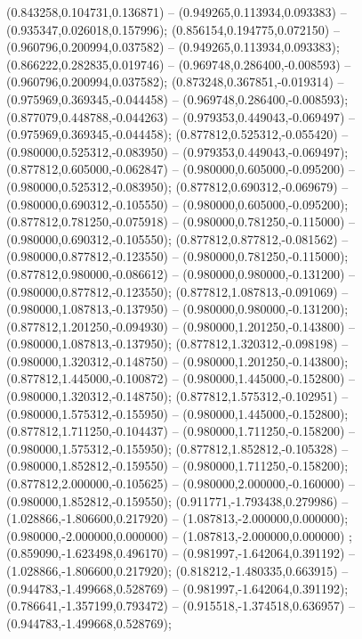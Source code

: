  (0.843258,0.104731,0.136871) -- (0.949265,0.113934,0.093383) -- (0.935347,0.026018,0.157996);
 (0.856154,0.194775,0.072150) -- (0.960796,0.200994,0.037582) -- (0.949265,0.113934,0.093383);
 (0.866222,0.282835,0.019746) -- (0.969748,0.286400,-0.008593) -- (0.960796,0.200994,0.037582);
 (0.873248,0.367851,-0.019314) -- (0.975969,0.369345,-0.044458) -- (0.969748,0.286400,-0.008593);
 (0.877079,0.448788,-0.044263) -- (0.979353,0.449043,-0.069497) -- (0.975969,0.369345,-0.044458);
 (0.877812,0.525312,-0.055420) -- (0.980000,0.525312,-0.083950) -- (0.979353,0.449043,-0.069497);
 (0.877812,0.605000,-0.062847) -- (0.980000,0.605000,-0.095200) -- (0.980000,0.525312,-0.083950);
 (0.877812,0.690312,-0.069679) -- (0.980000,0.690312,-0.105550) -- (0.980000,0.605000,-0.095200);
 (0.877812,0.781250,-0.075918) -- (0.980000,0.781250,-0.115000) -- (0.980000,0.690312,-0.105550);
 (0.877812,0.877812,-0.081562) -- (0.980000,0.877812,-0.123550) -- (0.980000,0.781250,-0.115000);
 (0.877812,0.980000,-0.086612) -- (0.980000,0.980000,-0.131200) -- (0.980000,0.877812,-0.123550);
 (0.877812,1.087813,-0.091069) -- (0.980000,1.087813,-0.137950) -- (0.980000,0.980000,-0.131200);
 (0.877812,1.201250,-0.094930) -- (0.980000,1.201250,-0.143800) -- (0.980000,1.087813,-0.137950);
 (0.877812,1.320312,-0.098198) -- (0.980000,1.320312,-0.148750) -- (0.980000,1.201250,-0.143800);
 (0.877812,1.445000,-0.100872) -- (0.980000,1.445000,-0.152800) -- (0.980000,1.320312,-0.148750);
 (0.877812,1.575312,-0.102951) -- (0.980000,1.575312,-0.155950) -- (0.980000,1.445000,-0.152800);
 (0.877812,1.711250,-0.104437) -- (0.980000,1.711250,-0.158200) -- (0.980000,1.575312,-0.155950);
 (0.877812,1.852812,-0.105328) -- (0.980000,1.852812,-0.159550) -- (0.980000,1.711250,-0.158200);
 (0.877812,2.000000,-0.105625) -- (0.980000,2.000000,-0.160000) -- (0.980000,1.852812,-0.159550);
 (0.911771,-1.793438,0.279986) -- (1.028866,-1.806600,0.217920) -- (1.087813,-2.000000,0.000000);
 (0.980000,-2.000000,0.000000) -- (1.087813,-2.000000,0.000000) ;
 (0.859090,-1.623498,0.496170) -- (0.981997,-1.642064,0.391192) -- (1.028866,-1.806600,0.217920);
 (0.818212,-1.480335,0.663915) -- (0.944783,-1.499668,0.528769) -- (0.981997,-1.642064,0.391192);
 (0.786641,-1.357199,0.793472) -- (0.915518,-1.374518,0.636957) -- (0.944783,-1.499668,0.528769);
